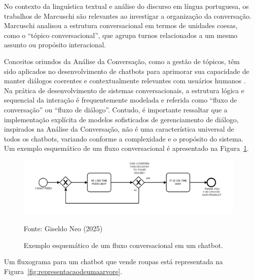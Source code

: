 \documentclass[a4paper,oneside]{book}
\begin{document}
No contexto da linguística textual e análise do discurso em língua portuguesa, os trabalhos de Marcuschi \cite{Marchuschi1986} são relevantes ao investigar a organização da conversação. Marcuschi analisou a estrutura conversacional em termos de unidades coesas, como o ``tópico conversacional'', que agrupa turnos relacionados a um mesmo assunto ou propósito interacional.

Conceitos oriundos da Análise da Conversação, como a gestão de tópicos, têm sido aplicados no desenvolvimento de chatbots para aprimorar sua capacidade de manter diálogos coerentes e contextualmente relevantes com usuários humanos \cite{Neves2005}. Na prática de desenvolvimento de sistemas conversacionais, a estrutura lógica e sequencial da interação é frequentemente modelada e referida como ``fluxo de conversação'' ou ``fluxo de diálogo''. Contudo, é importante ressaltar que a implementação explícita de modelos sofisticados de gerenciamento de diálogo, inspirados na Análise da Conversação, não é uma característica universal de todos os chatbots, variando conforme a complexidade e o propósito do sistema. Um exemplo esquemático de um fluxo conversacional é apresentado na Figura~\ref{fig:fluxo}.

\begin{figure}
	\centering
	\caption{Exemplo esquemático de um fluxo conversacional em um chatbot.}
	\includegraphics[width=1\linewidth]{fig/fluxo.png}
	\label{fig:fluxo}
	{\footnotesize 
	
	Fonte: Giseldo Neo (2025)}
\end{figure}

Um fluxograma para um chatbot que vende roupas está representada na Figura~\ref{fig:representacaodeumaarvore}.
\end{document}
